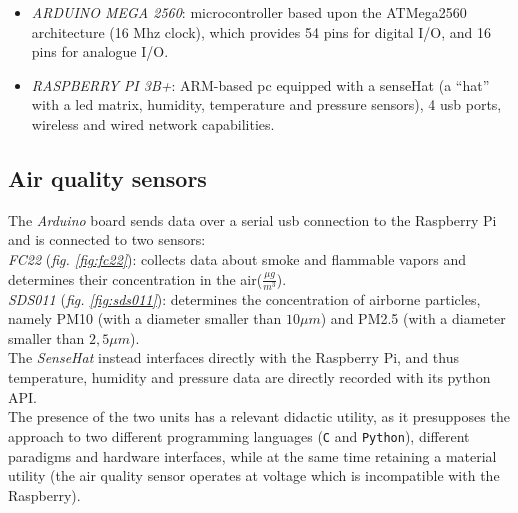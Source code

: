 \documentclass[12pt, a4paper]{article}
\begin{document}
\begin{itemize}
	\item \emph{ARDUINO MEGA 2560}: microcontroller based upon the ATMega2560 architecture (16 Mhz clock), which provides 54 pins for digital I/O, and 16 pins for analogue I/O.\\ 
	\item \emph{RASPBERRY PI 3B+}: ARM-based pc equipped with a senseHat (a ``hat'' with a led matrix, humidity, temperature and pressure sensors), 4 usb ports, wireless and wired network capabilities.
\end{itemize}

\subsection{Air quality sensors}
The \emph{Arduino} board sends data over a serial usb connection to the Raspberry Pi and is connected to two sensors:\\
\emph{FC22} (\emph{fig. \ref{fig:fc22}}): collects data about smoke and flammable vapors and determines their concentration in the air($\frac{\mu g}{m^3}$).\\
\emph{SDS011} (\emph{fig. \ref{fig:sds011}}): determines the concentration of airborne particles, namely PM10 (with a diameter smaller than $10\mu m$) and PM2.5 (with a diameter smaller than $2,5 \mu m$).\\
The \emph{SenseHat} instead interfaces directly with the Raspberry Pi, and thus temperature, humidity and pressure data are directly recorded with its python API.\\
The presence of the two units has a relevant didactic utility, as it presupposes the approach to two different programming languages (\texttt {C} and \texttt{Python}),  different paradigms and hardware interfaces, while at the same time retaining a material utility (the air quality sensor operates at voltage which is incompatible with the Raspberry).
\end{document}
